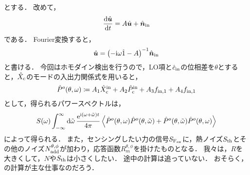     とする．
    改めて，
    \begin{align}
      \dv{\hat{\bm{u}}}{t} = A\hat{\bm{u}} + \hat{\bm{n}}_{\mathrm{in}}
    \end{align}
    である．
    Fourier変換すると，
    \begin{align}
      \hat{\bm{u}} = \qty(-\mathrm{i}\omega\hat{1} - A)^{-1}\hat{\bm{n}}_{\mathrm{in}}
    \end{align}
    と書ける．
    今回はホモダイン検出を行うので，LO項と$\hat{c}_{\mathrm{in}}$の位相差を$\theta$とすると，$\hat{X}_{\mathrm{c}}$のモードの入出力関係式を用いると，
    \begin{align}
      \hat{P}^o(\theta, \omega)\coloneqq A_1\hat{X}^{\mathrm{in}}_{\mathrm{c}} + A_2\hat{P}^{\mathrm{in}}_{\mathrm{c}} + A_3f_{\mathrm{in, 1}} + A_4f_{\mathrm{in, 1}} \label{PhysRevA.111.053508-main-work}
    \end{align}
    として，得られるパワースペクトルは，
    \begin{align}
      S(\omega) \int_{-\infty}^{\infty}\dd{\tilde{\omega}}\frac{\e^{\i\qty(\omega + \tilde{\omega})t}}{4\pi}\ev{\hat{P}^o(\theta, \omega)\hat{P}^o(\theta, \tilde{\omega}) + \hat{P}^o(\theta, \tilde{\omega})\hat{P}^o(\theta, \omega)}
    \end{align}
    によって得られる．
    また，センシングしたい力の信号$S_{\mathrm{F_{ex}}}$に，熱ノイズ$S_{\mathrm{th}}$とその他のノイズ$N^{\theta, \phi}_{\mathrm{add}}$が加わり，応答函数$R^{\theta, \phi}_m$を掛けたものとなる．
    我々は，$R$を大きくして，$N$や$S_{\mathrm{th}}$は小さくしたい．
    途中の計算は追っていない．
    おそらく，の計算が主な仕事なのだろう．